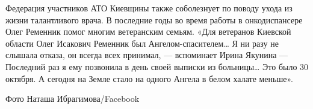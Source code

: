 Федерация участников АТО Киевщины также соболезнует по поводу ухода
из жизни талантливого врача. В последние годы во время работы
в онкодиспансере Олег Ременник помог многим ветеранским семьям. «Для
ветеранов Киевской области Олег Исакович Ременник был Ангелом-спасителем…
Я ни разу не слышала отказа, он всегда всех принимал, — вспоминает Ирина
Якунина — Последний раз я ему позвонила в день своей выписки из больницы…
Это было 30 октября. А сегодня на Земле стало на одного Ангела в белом
халате меньше».

Фото Наташа Ибрагимова/Facebook
